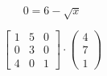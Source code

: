 \documentclass[10pt]{article}
\begin{document}
\begin{equation*}
0 = 6 - \sqrt{x}
\end{equation*}

\begin{equation*}
\begin{bmatrix}
1 & 5 & 0 \\
0 & 3 & 0 \\
4 & 0 & 1 
\end{bmatrix}\cdot

\begin{pmatrix}
4 \\
7 \\
1 
\end{pmatrix}
\end{equation*}
\end{document}
